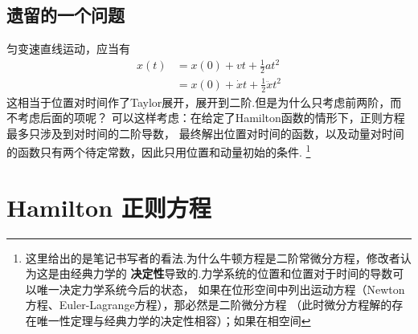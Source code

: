     \subsection{遗留的一个问题}
    匀变速直线运动，应当有
    \begin{equation}\begin{aligned}
        x(t) &= x(0) + vt + \frac 12 at^2 \\
        &= x(0) + \dot{x}t + \frac 12 \ddot{x}t^2
    \end{aligned}\end{equation}
    这相当于位置对时间作了Taylor展开，展开到二阶.但是为什么只考虑前两阶，而不考虑后面的项呢？
    可以这样考虑：在给定了Hamilton函数的情形下，正则方程最多只涉及到对时间的二阶导数，
    最终解出位置对时间的函数，以及动量对时间的函数只有两个待定常数，因此只用位置和动量初始的条件.
    \footnote{
        这里给出的是笔记书写者的看法.为什么牛顿方程是二阶常微分方程，修改者认为这是由经典力学的
        \textbf{决定性}导致的.力学系统的位置和位置对于时间的导数可以唯一决定力学系统今后的状态，
        如果在位形空间中列出运动方程（Newton方程、Euler-Lagrange方程），那必然是二阶微分方程
        （此时微分方程解的存在唯一性定理与经典力学的决定性相容）；如果在相空间
    }
    \section{Hamilton 正则方程}
